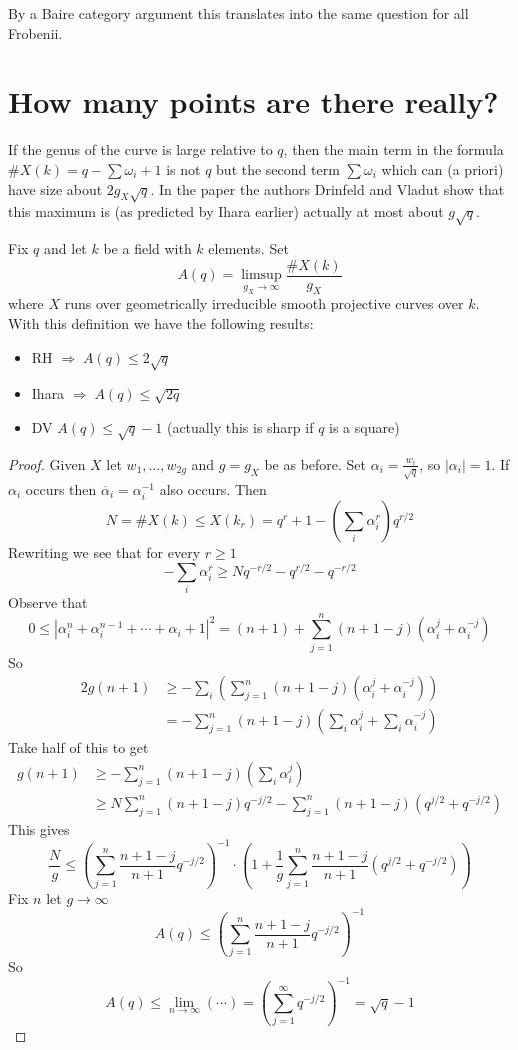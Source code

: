 \medskip\noindent
By a Baire category argument this translates into the same question
for all Frobenii.





\section{How many points are there really?}
\label{section-really}

\noindent
If the genus of the curve is large relative to $q$, then the main
term in the formula $\#X(k) = q - \sum \omega_i + 1$ is not $q$
but the second term $\sum \omega_i$ which can (a priori) have
size about $2g_X\sqrt{q}$. In the paper \cite{Drinfeld-number}
the authors Drinfeld and Vladut show that this maximum is (as predicted
by Ihara earlier) actually at most about $g\sqrt{q}$.

\medskip\noindent
Fix $q$ and let $k$ be a field with $k$ elements. Set
$$
A(q) = \limsup_{g_X \to \infty} \frac{\# X(k)}{g_X}
$$
where $X$ runs over geometrically irreducible smooth projective
curves over $k$. With this definition we have the following results:
\begin{itemize}
\item RH $\Rightarrow\; A(q)\leq 2\sqrt q$
\item Ihara $\Rightarrow\; A(q)\leq \sqrt{2q}$
\item DV $A(q)\leq \sqrt q-1$ (actually this is sharp if $q$ is a square)
\end{itemize}

\begin{proof}
Given $X$ let $w_1, \ldots, w_{2g}$ and $g = g_X$ be as before. Set
$\alpha_i = \frac{w_i}{\sqrt q}$, so $|\alpha_i| = 1$. If $\alpha_i$
occurs then $\overline{\alpha}_i = \alpha_i^{-1}$ also occurs. Then
$$
N = \# X(k) \leq X(k_r) = q^r + 1 - (\sum_i \alpha_i^r) q^{r/2}
$$
Rewriting we see that for every $r \geq 1$
$$
-\sum_i \alpha_i^r \geq Nq^{-r/2} - q^{r/2} - q^{-r/2}
$$
Observe that
$$
0 \leq |\alpha_i^n +\alpha_i^{n-1} +\cdots +\alpha_i +1|^2
= (n + 1) + \sum_{j = 1}^n (n + 1 - j) (\alpha_i^j + \alpha_i^{-j})
$$
So
\begin{align*}
2g(n+1) & \geq - \sum_i \left(\sum_{j=1}^n (n+1-j)(\alpha_i^j
+\alpha_i^{-j})\right)\\
& =-\sum_{j=1}^n (n+1-j)\left(\sum_i\alpha_i^j
+\sum_i\alpha_i^{-j}\right)
\end{align*}
Take half of this to get
\begin{align*}
g(n+1)& \geq -\sum_{j=1}^n (n+1-j)(\sum_i\alpha_i^j)\\
& \geq N\sum_{j=1}^n (n+1-j)q^{-j/2}-\sum_{j=1}^n
(n+1-j)(q^{j/2}+q^{-j/2})
\end{align*}
This gives
$$
\frac{N}{g}\leq \left(\sum_{j=1}^n \frac{n+1-j}{n+1}q^{-j/2}
\right)^{-1}\cdot\left(1+\frac{1}{g}\sum_{j=1}^n\frac{n+1-j}{n+1}(q^{j/2}+q^{-j/
2})\right)
$$
Fix $n$ let $g\to \infty$
$$
A(q)\leq \left(\sum_{j=1}^n \frac{n+1-j}{n+1}q^{-j/2}\right)^{-1}
$$
So
$$
A(q)\leq \lim_{n\to\infty}(\cdots) = \left(\sum_{j=1}^\infty
q^{-j/2}\right)^{-1}=\sqrt q-1
$$
\end{proof}











